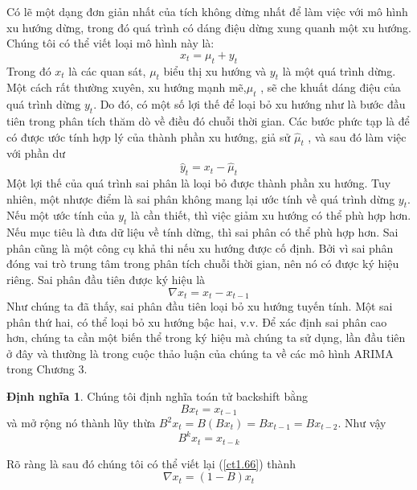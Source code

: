 \documentclass[12pt, a4paper,oneside]{book}
\theoremstyle{definition}
\newtheorem{dn}[theo]{Định nghĩa}
\begin{document}
Có lẽ một dạng đơn giản nhất của tích không dừng nhất để làm việc với mô hình xu hướng dừng, trong đó quá trình có dáng điệu dừng xung quanh một xu hướng. Chúng tôi có thể viết loại mô hình này là:
\begin{equation}
x_{t}=\mu_{t}+y_{t} \label{ct1.63}
\end{equation}
Trong đó $ x_{t} $ là các quan sát, $ \mu_{t} $ biểu thị xu hướng và $ y_{t} $ là một quá trình dừng. Một cách rất thường xuyên, xu hướng mạnh mẽ,$ \mu_{t} $ , sẽ che khuất dáng điệu của quá trình dừng $ y_{t} $. Do đó, có một số lợi thế để loại bỏ xu hướng như là bước đầu tiên trong phân tích thăm dò về điều đó chuỗi thời gian. Các bước phức tạp là để có được ước tính hợp lý của thành phần xu hướng, giả sử $ \hat{\mu}_{t} $ , và sau đó làm việc với phần dư
\begin{equation}
\hat{y}_{t}=x_{t}-\hat{\mu}_{t} \label{ct1.64}
\end{equation}
Một lợi thế của quá trình sai phân là loại bỏ được thành phần xu hướng. Tuy nhiên, một nhược điểm là sai phân không mang lại ước tính về quá trình dừng $y_{t}$. Nếu một ước tính của $ y_{t} $ là cần thiết, thì việc giảm xu hướng có thể phù hợp hơn. Nếu mục tiêu là đưa dữ liệu về tính dừng, thì sai phân có thể phù hợp hơn. Sai phân cũng là một công cụ khả thi nếu xu hướng được cố định.
Bởi vì sai phân đóng vai trò trung tâm trong phân tích chuỗi thời gian, nên nó có được ký hiệu riêng. Sai phân đầu tiên được ký hiệu là
\begin{equation}
\nabla x_{t}=x_{t}-x_{t-1} \label{ct1.66}
\end{equation}
Như chúng ta đã thấy, sai phân đầu tiên loại bỏ xu hướng tuyến tính. Một sai phân thứ hai,  có thể loại bỏ xu hướng bậc hai, v.v. Để xác định sai phân cao hơn, chúng ta cần một biến thể trong ký hiệu mà chúng ta sử dụng, lần đầu tiên ở đây và thường là trong cuộc thảo luận của chúng ta về các mô hình ARIMA trong Chương 3.
\begin{dn}
	Chúng tôi định nghĩa toán tử backshift bằng
	\begin{equation}
	Bx_{t}=x_{t-1} \label{ct1.67}
	\end{equation}
	và mở rộng nó thành lũy thừa 	$B^{2}x_{t}=B(Bx_{t})=Bx_{t-1}=Bx_{t-2}$. Như vậy
	\begin{equation}
	B^{k}x_{t}=x_{t-k} \label{ct1.68}	
	\end{equation}
\end{dn}
Rõ ràng là sau đó chúng tôi có thể viết lại (\ref{ct1.66}) thành
\begin{equation}
	\nabla x_{t}=(1-B)x_{t} \label{ct1.69}
\end{equation}
\end{document}
